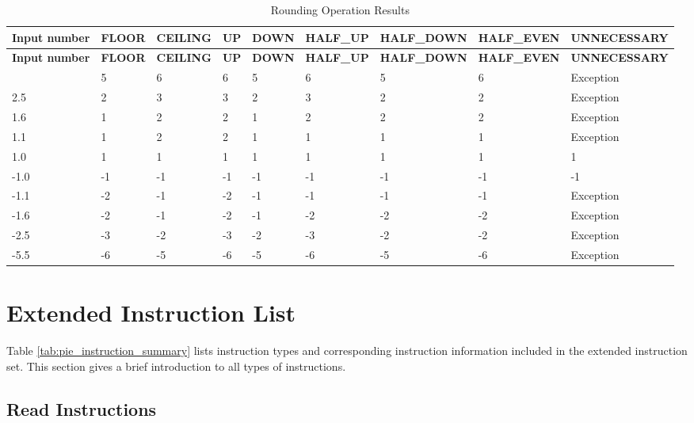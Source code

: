 \documentclass[main\_\_EN.tex]{subfiles}
\begin{document}
\begin{longtable}[c]{|l|l|l|l|l|l|l|l|l|}
    \caption{Rounding Operation Results}
    \label{tab:ESP-rounding-mode-results}\\
    \hline
    \rowcolor{lightgray}
    \textbf{Input number} & \textbf{FLOOR} & \textbf{CEILING} & \textbf{UP} & \textbf{DOWN}  & \textbf{HALF\_UP} & \textbf{HALF\_DOWN} & \textbf{HALF\_EVEN} & \textbf{UNNECESSARY}\\\hline
    \endfirsthead
    \rowcolor{lightgray}
        \textbf{Input number} & \textbf{FLOOR} & \textbf{CEILING} & \textbf{UP} & \textbf{DOWN}  & \textbf{HALF\_UP} & \textbf{HALF\_DOWN} & \textbf{HALF\_EVEN} & \textbf{UNNECESSARY} \\\hline
    \endhead
    \endfoot
 5.5 & 5 & 6& 6 &5 & 6 & 5 & 6 & Exception \\\hline
 2.5 & 2 & 3& 3& 2& 3& 2& 2& Exception \\\hline
 1.6 & 1 & 2& 2& 1& 2& 2& 2& Exception \\\hline
 1.1 & 1 & 2& 2& 1& 1& 1& 1& Exception \\\hline
 1.0 & 1 & 1& 1& 1& 1& 1& 1& 1 \\\hline
 -1.0 & -1 & -1 & -1 & -1 & -1 & -1 & -1 & -1 \\\hline
 -1.1 & -2 & -1 & -2 & -1 & -1 & -1 & -1 & Exception \\\hline
 -1.6 & -2 & -1 &-2 & -1 & -2 & -2& -2& Exception \\\hline
 -2.5 & -3 & -2 & -3 & -2 & -3 & -2 & -2 & Exception \\\hline
 -5.5 & -6 & -5 & -6 & -5 & -6 & -5 & -6 & Exception \\\hline
    \end{longtable}

\section{Extended Instruction List}\label{sec:pie-instruction-simple-introduction}

Table \ref{tab:pie_instruction_summary} lists instruction types and corresponding instruction information included in the extended instruction set. This section gives a brief introduction to all types of instructions.

\newpage


\subsection{Read Instructions}
\label{sec:pie-load-instructions}
\end{document}
